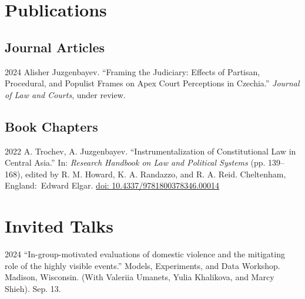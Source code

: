 \documentclass[11pt,letterpaper]{report}
\begin{document}
    \section*{Publications}

   \subsection*{Journal Articles}

   \begin{tablist}

       

        \item[2024] \tab{}Alisher Juzgenbayev. \enquote{Framing the Judiciary: Effects of Partisan, Procedural, and Populist Frames on Apex Court Perceptions in Czechia.} \textit{Journal of Law and Courts}, under review.

      

    \end{tablist}



    \subsection*{Book Chapters}

    \begin{tablist}

        \item[2022] \tab{}A. Trochev, A. Juzgenbayev. \enquote{Instrumentalization of Constitutional Law in Central Asia.} In: \textit{Research Handbook on Law and Political Systems} (pp. 139--168), edited by R. M. Howard, K. A. Randazzo, and  R. A. Reid. Cheltenham, England:\ Edward Elgar. \href{https://doi.org/10.4337/9781800378346.00014}{doi: 10.4337/9781800378346.00014}

    \end{tablist}



    \section*{Invited Talks}

   \begin{tablist}

     \item[2024] \tab{}\enquote{In-group-motivated evaluations of domestic violence and the mitigating role of the highly visible events.} Models, Experiments, and Data Workshop. Madison, Wisconsin. (With Valeriia Umanets, Yulia Khalikova, and Marcy Shieh). Sep. 13.

    \end{tablist}
\end{document}
